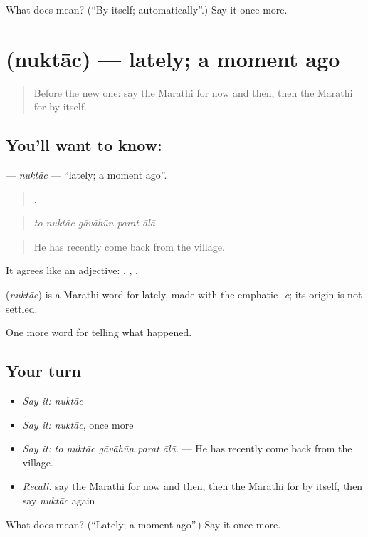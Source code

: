 \begin{tcolorbox}[breakable,colback=teal!4,colframe=teal!35!black,title={Before you move on}]
What does  mean? (\textquotedblleft{}By itself; automatically\textquotedblright{}.) Say it once more.
\end{tcolorbox}
\section[\texorpdfstring{\mr{नुकताच} (nuktāc)}{नुकताच (nuktāc)}]{ (nuktāc) — lately; a moment ago}

\label{lesson:MR-C306-nuktac}



\begin{quote}
Before the new one: say the Marathi for now and then, then the Marathi for by itself.
\end{quote}

\subsection*{You'll want to know: }
\textbf{} — \emph{nuktāc} — \textquotedblleft{}lately; a moment ago\textquotedblright{}.

\begin{quote}
    .
\end{quote}

\begin{quote}
\emph{to nuktāc gāvāhūn parat ālā.}
\end{quote}

\begin{quote}
He has recently come back from the village.
\end{quote}

It agrees like an adjective:   ,   ,   .

\begin{cousinweb}
\textbf{} (\emph{nuktāc}) is a Marathi word for lately, made with the emphatic \emph{-c}; its origin is not settled.
\end{cousinweb}

\begin{grammarlens}[title={What you've built}]
One more word for telling what happened.
\end{grammarlens}

\subsection*{Your turn}
\begin{itemize}
\raggedright
  \item \emph{Say it:} \emph{nuktāc}
  \item \emph{Say it:} \emph{nuktāc}, once more
  \item \emph{Say it:} \emph{to nuktāc gāvāhūn parat ālā.} — He has recently come back from the village.
  \item \emph{Recall:} say the Marathi for now and then, then the Marathi for by itself, then say \emph{nuktāc} again
\end{itemize}

\begin{tcolorbox}[breakable,colback=teal!4,colframe=teal!35!black,title={Before you move on}]
What does  mean? (\textquotedblleft{}Lately; a moment ago\textquotedblright{}.) Say it once more.
\end{tcolorbox}
